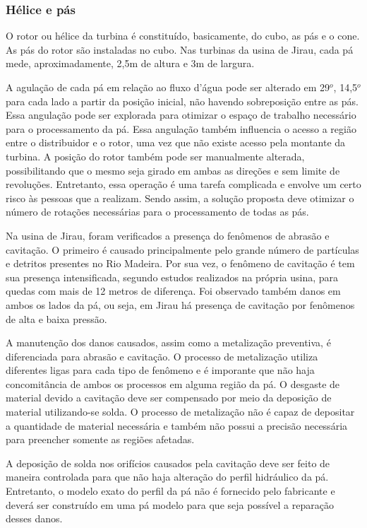 \subsubsection{Hélice e pás}
 
O rotor ou hélice da turbina é constituído, basicamente, do cubo, as pás e o cone. As pás do rotor são instaladas no cubo. Nas turbinas da usina de Jirau, cada pá mede, aproximadamente, 2,5m de altura e 3m de largura. 

A agulação de cada pá em relação ao fluxo d'água pode ser alterado em 29$^o$, 14,5$^o$ para cada lado a partir da posição inicial, não havendo sobreposição entre as pás. Essa angulação pode ser explorada para otimizar o espaço de trabalho necessário para o processamento da pá. Essa angulação também influencia o acesso a região entre o distribuidor e o rotor, uma vez que não existe acesso pela montante da turbina. A posição do rotor também pode ser manualmente alterada, possibilitando que o mesmo seja girado em ambas as direções e sem limite de revoluções. Entretanto, essa operação é uma tarefa complicada e envolve um certo risco às pessoas que a realizam. Sendo assim, a solução proposta deve otimizar o número de rotações necessárias para o processamento de todas as pás.

Na usina de Jirau, foram verificados a presença do fenômenos de abrasão e cavitação. O primeiro é causado principalmente pelo grande número de partículas e detritos presentes no Rio Madeira. Por sua vez, o fenômeno de cavitação é tem sua presença intensificada, segundo estudos realizados na própria usina, para quedas com mais de 12 metros de diferença. Foi observado também danos em ambos os lados da pá, ou seja, em Jirau há presença de cavitação por fenômenos de alta e baixa pressão. 

A manutenção dos danos causados, assim como a metalização preventiva, é diferenciada para abrasão e cavitação. O processo de metalização utiliza diferentes ligas para cada tipo de fenômeno e é imporante que não haja concomitância de ambos os processos em alguma região da pá. O desgaste de material devido a cavitação deve ser compensado por meio da deposição de material utilizando-se solda. O processo de metalização não é capaz de depositar a quantidade de material necessária e também não possui a precisão necessária para preencher somente as regiões afetadas. 

A deposição de solda nos orifícios causados pela cavitação deve ser feito de maneira controlada para que não haja alteração do perfil hidráulico da pá. Entretanto, o modelo exato do perfil da pá não é fornecido pelo fabricante e deverá ser construído em uma pá modelo para que seja possível a reparação desses danos.

